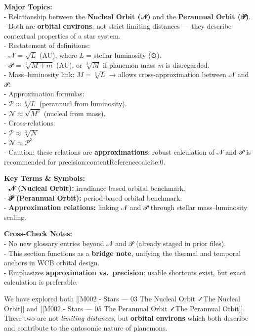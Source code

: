 \documentclass[
  letterpaper,
]{book}
\begin{document}
\textbf{Major Topics:}\\
- Relationship between the \textbf{Nucleal Orbit (𝒩)} and the
\textbf{Perannual Orbit (𝒫)}.\\
- Both are \textbf{orbital environs}, not strict limiting distances ---
they describe contextual properties of a star system.\\
- Restatement of definitions:\\
- 𝒩 = \(\sqrt{L}\) (AU), where \emph{L} = stellar luminosity (⊙).\\
- 𝒫 = \(\sqrt[3]{M+m}\) (AU), or \(\sqrt[3]{M}\) if planemon mass
\emph{m} is disregarded.\\
- Mass--luminosity link: \(M = \sqrt[3]{L}\) → allows
cross-approximation between 𝒩 and 𝒫.\\
- Approximation formulas:\\
- \(\mathcal{P} \approx \sqrt[6]{L}\) (perannual from luminosity).\\
- \(\mathcal{N} \approx \sqrt{M^3}\) (nucleal from mass).\\
- Cross-relations:\\
- \(\mathcal{P} \approx \sqrt[3]{\mathcal{N}}\)\\
- \(\mathcal{N} \approx \mathcal{P}^3\)\\
- Caution: these relations are \textbf{approximations}; robust
calculation of 𝒩 and 𝒫 is recommended for
precision:contentReference{oaicite:0}.

\textbf{Key Terms \& Symbols:}\\
- \textbf{𝒩 (Nucleal Orbit):} irradiance-based orbital benchmark.\\
- \textbf{𝒫 (Perannual Orbit):} period-based orbital benchmark.\\
- \textbf{Approximation relations:} linking 𝒩 and 𝒫 through stellar
mass--luminosity scaling.

\textbf{Cross-Check Notes:}\\
- No new glossary entries beyond 𝒩 and 𝒫 (already staged in prior
files).\\
- This section functions as a \textbf{bridge note}, unifying the thermal
and temporal anchors in WCB orbital design.\\
- Emphasizes \textbf{approximation vs.~precision}: usable shortcuts
exist, but exact calculation is preferable.

We have explored both {[}{[}M002 - Stars --- 03 The Nucleal Orbit
✓\textbar The Nucleal Orbit{]}{]} and {[}{[}M002 - Stars --- 05 The
Perannual Orbit ✓\textbar The Perannual Orbit{]}{]}. These two are not
\emph{limiting distances}, but \textbf{orbital environs} which both
describe and contribute to the ontosomic nature of planemons.
\end{document}

